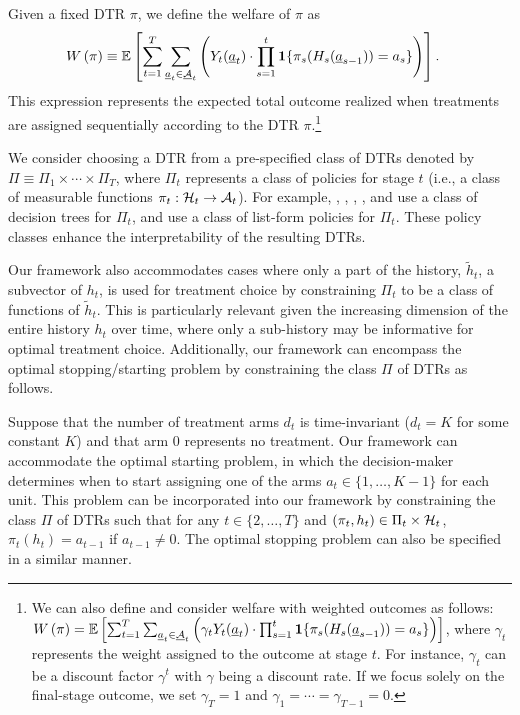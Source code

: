Given a fixed DTR $\pi$, we define the welfare of $\pi$ as
\begin{align*}
W\left(\pi\right) &\equiv   
\mathbb{E}\left[\sum_{t=1}^{T}\sum_{\underline{a}_t \in \underline{\mathcal{A}}_t}\left( Y_{t}(\underline{a}_t)\cdot \prod_{s=1}^{t}\mathbf{1}\{\pi_s(H_{s}(\underline{a}_{s-1}))=a_s\}\right)\right].
\end{align*}
This expression represents the expected total outcome realized when treatments are assigned sequentially according to the DTR $\pi$.\footnote{We can also define and consider welfare with weighted outcomes as follows: $W\left(\pi\right) =   
\mathbb{E}\left[\sum_{t=1}^{T}\sum_{\underline{a}_t \in \underline{\mathcal{A}}_t}\left(\gamma_{t} Y_{t}(\underline{a}_t)\cdot \prod_{s=1}^{t}\mathbf{1}\{\pi_s(H_{s}(\underline{a}_{s-1}))=a_s\}\right)\right]$, where $\gamma_{t}$ represents the weight assigned to the outcome at stage $t$. For instance, $\gamma_t$ can be a discount factor $\gamma^t$ with $\gamma$ being a discount rate. If we focus solely on the final-stage outcome, we set $\gamma_{T}=1$ and $\gamma_{1}=\cdots=\gamma_{T-1}=0$.}

We consider choosing a DTR from a pre-specified class of DTRs denoted by $\Pi \equiv \Pi_{1}\times\cdots\times \Pi_{T}$, where $\Pi_{t}$ represents a class of policies for stage $t$ (i.e., a class of measurable functions $\pi_{t}:\mathcal{H}_{t}\rightarrow \mathcal{A}_{t}$). For example, \cite{Laber_Zhao_2015}, \cite{Tao_et_al_2018}, \cite{Sun_Wang_2021},  \cite{Blumlein_et_al_2022}, and \cite{zhou_et_al_2023} use a class of decision trees \citep{Breiman84book} for $\Pi_t$, and \cite{Zhang_et_al_2018} use a class of list-form policies for $\Pi_t$. These policy classes enhance the interpretability of the resulting DTRs.%

Our framework also accommodates cases where only a part of the history, $\tilde{h}_t$, a subvector of $h_{t}$, is used for treatment choice by constraining $\Pi_t$ to be a class of functions of $\tilde{h}_t$. This is particularly relevant given the increasing dimension of the entire history $h_t$ over time, where only a sub-history may be informative for optimal treatment choice. 
Additionally, our framework can encompass the optimal stopping/starting problem by constraining the class $\Pi$ of DTRs as follows.

\medskip

\begin{example}\label{eg:optimal_start}
Suppose that the number of treatment arms $d_t$ is time-invariant ($d_t = K$ for some constant $K$) and that arm $0$ represents no treatment. Our framework can accommodate the optimal starting problem, in which the decision-maker determines when to start assigning one of the arms $a_t \in \{1,\ldots,K-1\}$ for each unit. This problem can be incorporated into our framework by constraining the class $\Pi$ of DTRs such that for any $t \in \{2,\ldots,T\}$ and $(\pi_{t}, h_{t}) \in \Pi_{t} \times \mathcal{H}_{t}$, $\pi_{t}(h_t) = a_{t-1}$ if $a_{t-1} \neq 0$. The optimal stopping problem can also be specified in a similar manner.
\end{example}
\medskip

